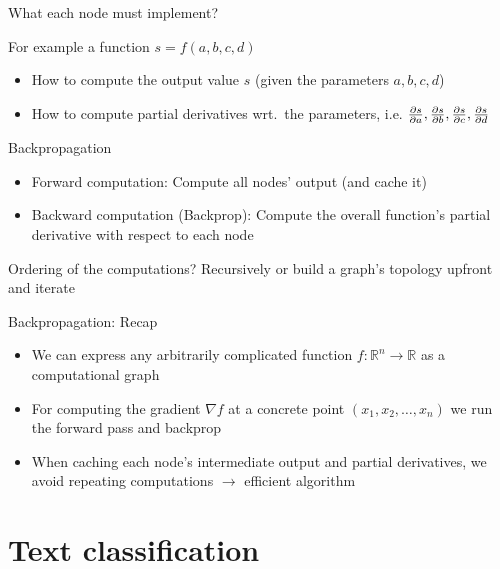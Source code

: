 \documentclass[12pt,aspectratio=169,handout]{beamer}
\begin{document}
\begin{frame}{What each node must implement?}
	
	For example a function $s = f(a, b, c, d)$
	
	\begin{itemize}
		\item How to compute the output value $s$ (given the parameters $a, b, c, d$)
		\item How to compute partial derivatives wrt.\ the parameters, i.e. $\pdv{s}{a}, \pdv{s}{b}, \pdv{s}{c}, \pdv{s}{d}$
	\end{itemize}
	
\end{frame}

\begin{frame}{Backpropagation}
	
	\begin{itemize}
		\item Forward computation: Compute all nodes' output (and cache it)
		\item Backward computation (Backprop): Compute the overall function's partial derivative with respect to each node
	\end{itemize}
	
	\bigskip
	
	Ordering of the computations? Recursively or build a graph's topology upfront and iterate
	
\end{frame}


\begin{frame}{Backpropagation: Recap}
	\begin{itemize}
		\item We can express any arbitrarily complicated function $f: \mathbb{R}^n \to \mathbb{R}$ as a computational graph
		\item For computing the gradient $\nabla f$ at a concrete point $(x_1, x_2, \ldots, x_n)$ we run the forward pass and backprop
		\item When caching each node's intermediate output and partial derivatives, we avoid repeating computations $\to$ efficient algorithm
	\end{itemize}
\end{frame}






\section{Text classification}
\end{document}
